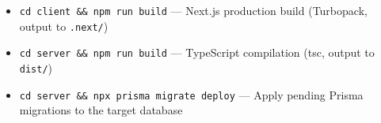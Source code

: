 \begin{itemize}[leftmargin=*]
  \item \texttt{cd client \&\& npm run build} --- Next.js production build
    (Turbopack, output to \texttt{.next/})
  \item \texttt{cd server \&\& npm run build} --- TypeScript compilation
    (tsc, output to \texttt{dist/})
  \item \texttt{cd server \&\& npx prisma migrate deploy} --- Apply pending
    Prisma migrations to the target database
\end{itemize}
